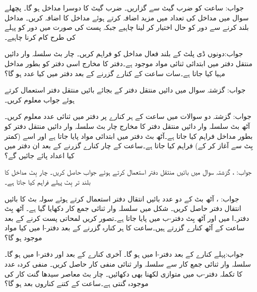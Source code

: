  جواب: ساعت  کو ضرب گیٹ سے گزاریں۔ ضرب گیٹ کا دوسرا مداخل  ہو گا۔
 پچھلے سوال   میں  مداخل کی تعداد میں مزید اضافہ کرتے ہوئے مداخل   کا اضافہ کریں۔ مداخل   بلند کرنے سے دور کو حال  اختیار کر لینا چاہیے جبکہ پست   کی صورت میں دور  کو  پہلے کی طرح کام کرنا چاہیے۔
 
 جواب:دونوں  ڈی پلٹ  کے بلند فعال   مداخل کو   فراہم کریں۔
 چار بٹ  سلسلہ وار دائیں منتقل دفتر میں ابتدائی ثنائی مواد   موجود ہے۔دفتر کا مخارج  اسی دفتر کو بطور مداخل مہیا کیا جاتا ہے۔سات ساعت کے کنارے گزرنے کے بعد دفتر میں کیا عدد ہو گا؟
 
 جواب: 
  گزشتہ سوال میں دائیں منتقل دفتر کے بجائے بائیں منتقل دفتر استعمال کرتے ہوئے  جواب معلوم کریں۔
  
  جواب: 
 گزشتہ دو سوالات میں  ساعت  کے ہر کنارے پر دفتر میں ثنائی عدد  معلوم  کریں۔
 آٹھ بٹ  سلسلہ وار دائیں منتقل دفتر کا  مخارج  چار بٹ  سلسلہ وار دائیں منتقل دفتر  کو بطور مداخل فراہم کیا جاتا ہے۔آٹھ بٹ دفتر میں ابتدائی مواد  پایا جاتا ہے  اور  اسے     (کمتر بِٹ سے آغاز کر کے)    فراہم کیا جاتا ہے۔ساعت کے چار  کنارے گزرنے کے بعد ان دفتر  میں کیا اعداد پائے جائیں گے؟
 
 جواب: ،  
 گزشتہ سوال میں  بائیں منتقل دفتر استعمال کرتے  ہوئے جواب حاصل کریں۔ چار بِٹ مداخل کا بلند تر بِٹ پہلے فراہم کیا جاتا ہے۔
 
 جواب: ، 
 آٹھ بٹ کے دو عدد بائیں  انتقال  دفتر استعمال کرتے ہوئے سولہ بٹ کا  بائیں انتقال دفتر حاصل کریں۔
 شکل     میں سلسلہ وار ثنائی جمع کار دکھایا گیا ہے۔ آٹھ بِٹ دفتر۔ا  میں   اور  آٹھ بِٹ دفتر-ب   میں  پایا جاتا ہے۔تصور کریں     لمحاتی  پست کرنے کے بعد ساعت کے آٹھ کنارے گزرتے ہیں۔ساعت کا ہر کنارہ گزرنے کے بعد دفتر-ا میں  کیا مواد موجود ہو گا؟
 
 جواب:پہلے کنارے کے بعد دفتر-ا میں  ہو گا۔  آخری کنارے کے بعد  اور  دفتر-ا میں  ہو گا۔
 سلسلہ وار ثنائی جمع کار سے سلسلہ وار ثنائی منفی کار حاصل کریں۔ منفی  کردہ عدد کا تکملہ  دفتر-ب میں متوازی لکھنا بھی دکھائیں۔
 چار بٹ معاصر سیدھا گنت کار کی موجودہ گنتی   ہے۔ساعت کے کتنے کناروں بعد   ہو گا؟
 
